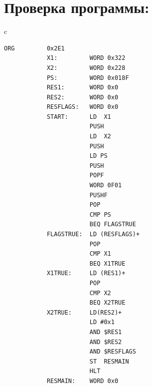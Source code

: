 \section{Проверка программы:}
\begin{center}
    \begin{tabular}{c}
        \begin{lstlisting}[basicstyle=\ttfamily\tiny]
            ORG         0x2E1
            X1:         WORD 0x322
            X2:         WORD 0x228
            PS:         WORD 0x018F
            RES1:       WORD 0x0
            RES2:       WORD 0x0
            RESFLAGS:   WORD 0x0
            START:      LD  X1
                        PUSH
                        LD  X2
                        PUSH
                        LD PS
                        PUSH
                        POPF
                        WORD 0F01
                        PUSHF
                        POP
                        CMP PS
                        BEQ FLAGSTRUE
            FLAGSTRUE:  LD (RESFLAGS)+
                        POP
                        CMP X1
                        BEQ X1TRUE
            X1TRUE:     LD (RES1)+
                        POP
                        CMP X2
                        BEQ X2TRUE
            X2TRUE:     LD(RES2)+
                        LD #0x1
                        AND $RES1
                        AND $RES2
                        AND $RESFLAGS
                        ST  RESMAIN
                        HLT
            RESMAIN:    WORD 0x0
        \end{lstlisting}
    \end{tabular}
\end{center}


